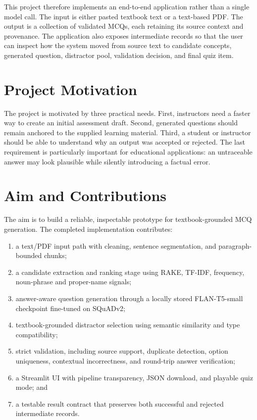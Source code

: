 \documentclass[12pt,a4paper]{report}
\begin{document}
This project therefore implements an end-to-end application rather than a single model call. The input is either pasted textbook text or a text-based PDF. The output is a collection of validated MCQs, each retaining its source context and provenance. The application also exposes intermediate records so that the user can inspect how the system moved from source text to candidate concepts, generated question, distractor pool, validation decision, and final quiz item.

\section{Project Motivation}
The project is motivated by three practical needs. First, instructors need a faster way to create an initial assessment draft. Second, generated questions should remain anchored to the supplied learning material. Third, a student or instructor should be able to understand why an output was accepted or rejected. The last requirement is particularly important for educational applications: an untraceable answer may look plausible while silently introducing a factual error.

\section{Aim and Contributions}
The aim is to build a reliable, inspectable prototype for textbook-grounded MCQ generation. The completed implementation contributes:
\begin{enumerate}
\item a text/PDF input path with cleaning, sentence segmentation, and paragraph-bounded chunks;
\item a candidate extraction and ranking stage using RAKE, TF-IDF, frequency, noun-phrase and proper-name signals;
\item answer-aware question generation through a locally stored FLAN-T5-small checkpoint fine-tuned on SQuADv2;
\item textbook-grounded distractor selection using semantic similarity and type compatibility;
\item strict validation, including source support, duplicate detection, option uniqueness, contextual incorrectness, and round-trip answer verification;
\item a Streamlit UI with pipeline transparency, JSON download, and playable quiz mode; and
\item a testable result contract that preserves both successful and rejected intermediate records.
\end{enumerate}
\end{document}
